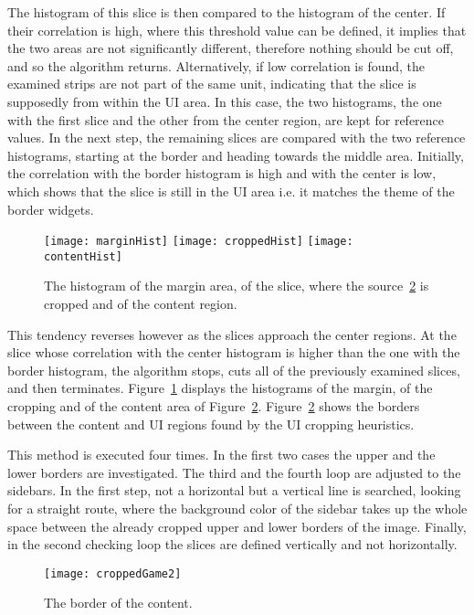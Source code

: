 \documentclass[draft,final]{vutinfth} %
\begin{document}
	The histogram of this slice is then compared to the histogram of the center.
	If their correlation is high, where this threshold value can be defined, it implies that the two areas are not significantly different, therefore nothing should be cut off, and so the algorithm returns.
	Alternatively, if low correlation is found, the examined strips are not part of the same unit, indicating that the slice is supposedly from within the UI area.
	In this case, the two histograms, the one with the first slice and the other from the center region, are kept for reference values.
	In the next step, the remaining slices are compared with the two reference histograms, starting at the border and heading towards the middle area.
	Initially, the correlation with the border histogram is high and with the center is low, which shows that the slice is still in the UI area i.e. it matches the theme of the border widgets.
	\begin{figure}[H]
		\texttt{[image: marginHist]}\hfill
		\texttt{[image: croppedHist]}\hfill
		\texttt{[image: contentHist]}
		\caption{The histogram of the margin area, of the slice, where the source~\ref{fig:cropped} is cropped and of the content region.}
		\label{fig:hist}
	\end{figure}
	This tendency reverses however as the slices approach the center regions.
	At the slice whose correlation with the center histogram is higher than the one with the border histogram, the algorithm stops, cuts all of the previously examined slices, and then terminates.
	Figure~\ref{fig:hist} displays the histograms of the margin, of the cropping and of the content area of Figure~\ref{fig:cropped}.
	Figure~\ref{fig:cropped} shows the borders between the content and UI regions found by the UI cropping heuristics.\par 	
	This method is executed four times.
	In the first two cases the upper and the lower borders are investigated.
	The third and the fourth loop are adjusted to the sidebars.
	In the first step, not a horizontal but a vertical line is searched, looking for a straight route, where the background color of the sidebar takes up the whole space between the already cropped upper and lower borders of the image.
	Finally, in the second checking loop the slices are defined vertically and not horizontally.
	\begin{figure}[H]
		\centering		
		\texttt{[image: croppedGame2]}
		\caption{The border of the content.}
		\label{fig:cropped}
	\end{figure}
\end{document}
